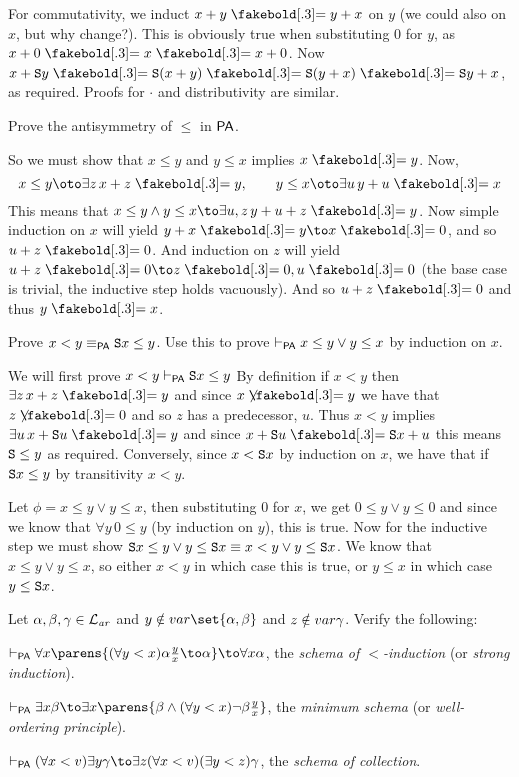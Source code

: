 For commutativity, we induct $x+y\eq y+x$ on $y$ (we could also on $x$, but why change?).
This is obviously true when substituting $0$ for $y$, as $x+0\eq x\eq x+0$.
Now $x+{\tt S}y\eq{\tt S}(x+y)\eq{\tt S}(y+x)\eq{\tt S}y+x$, as required.
Proofs for $\cdot$ and distributivity are similar.

\bexerc

    Prove the antisymmetry of $\leq$ in ${\sf PA}$.

\eexerc

So we must show that $x\leq y$ and $y\leq x$ implies $x\eq y$.
Now,
$$ x\leq y\oto\exists z\,x+z\eq y,\qquad y\leq x\oto\exists u\,y+u\eq x $$
This means that $x\leq y\land y\leq x\to\exists u,z\,y+u+z\eq y$.
Now simple induction on $x$ will yield $y+x\eq y\to x\eq0$, and so $u+z\eq0$.
And induction on $z$ will yield $u+z\eq0\to z\eq0,u\eq0$ (the base case is trivial, the inductive step holds vacuously).
And so $u+z\eq0$ and thus $y\eq x$.

\bexerc

    Prove $x<y\equiv_{\sf PA}{\tt S}x\leq y$.
    Use this to prove $\vdash_{\sf PA}x\leq y\lor y\leq x$ by induction on $x$.

\eexerc

We will first prove $x<y\vdash_{\sf PA}{\tt S}x\leq y$ 
By definition if $x<y$ then $\exists z\,x+z\eq y$ and since $x\neqb y$ we have that $z\neqb0$ and so $z$ has a predecessor, $u$.
Thus $x<y$ implies $\exists u\,x+{\tt S}u\eq y$ and since $x+{\tt S}u\eq{\tt S}x+u$ this means ${\tt S}\leq y$ as required.
Conversely, since $x<{\tt S}x$ by induction on $x$, we have that if ${\tt S}x\leq y$ by transitivity $x<y$.

Let $\phi=x\leq y\lor y\leq x$, then substituting $0$ for $x$, we get $0\leq y\lor y\leq0$ and since we know that $\forall y\,0\leq y$ (by induction on $y$), this is true.
Now for the inductive step we must show ${\tt S}x\leq y\lor y\leq{\tt S}x\equiv x<y\lor y\leq{\tt S}x$.
We know that $x\leq y\lor y\leq x$, so either $x<y$ in which case this is true, or $y\leq x$ in which case $y\leq{\tt S}x$.

\bexerc

    Let $\alpha,\beta,\gamma\in{\cal L}_{\it ar}$ and $y\notin\var\set{\alpha,\beta}$ and $z\notin{\sl var}\gamma$.
    Verify the following:
    \benum
        \item $\vdash_{\sf PA}\forall x\parens{(\forall y<x)\alpha\frac yx\to\alpha}\to\forall x\alpha$, the {\it schema of $<$-induction} (or {\it strong induction}).
        \item $\vdash_{\sf PA}\exists x\beta\to\exists x\parens{\beta\land(\forall y<x)\neg\beta\frac yx}$, the {\it minimum schema} (or {\it well-ordering principle}).
        \item $\vdash_{\sf PA}(\forall x<v)\exists y\gamma\to\exists z(\forall x<v)(\exists y<z)\gamma$, the {\it schema of collection}.
    \eenum

